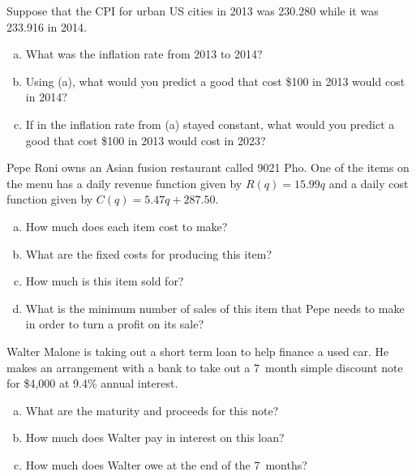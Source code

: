 \documentclass[12pt,letterpaper]{exam}
\begin{document}
\examtitle
{} 
\scores
\bottomline
\newpage

\begin{questions}

\newpage
\question[10] Suppose that the CPI for urban US cities in 2013 was 230.280 while it was 233.916 in 2014. 
	\begin{enumerate}[(a)]
	\item What was the inflation rate from 2013 to 2014?
	\item Using (a), what would you predict a good that cost \$100 in 2013 would cost in 2014?
	\item If in the inflation rate from (a) stayed constant, what would you predict a good that cost \$100 in 2013 would cost in 2023?
	\end{enumerate}



\newpage
\question[10] Pepe Roni owns an Asian fusion restaurant called 9021 Pho. One of the items on the menu has a daily revenue function given by $R(q)= 15.99q$ and a daily cost function given by $C(q)= 5.47q + 287.50$. 
	\begin{enumerate}[(a)]
	\item How much does each item cost to make?
	\item What are the fixed costs for producing this item?
	\item How much is this item sold for?
	\item What is the minimum number of sales of this item that Pepe needs to make in order to turn a profit on its sale?
	\end{enumerate}



\newpage
\question[10] Walter Malone is taking out a short term loan to help finance a used car. He makes an arrangement with a bank to take out a 7~month simple discount note for \$4,000 at 9.4\% annual interest. 
	\begin{enumerate}[(a)]
	\item What are the maturity and proceeds for this note?
	\item How much does Walter pay in interest on this loan?
	\item How much does Walter owe at the end of the 7~months?
	\end{enumerate} 




\end{questions}
\end{document}
